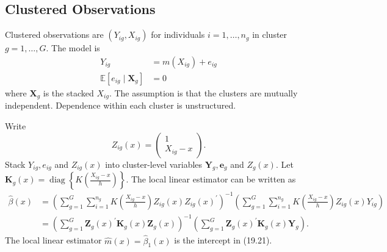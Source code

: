 \documentclass[10pt]{article}
\begin{document}
\subsection{Clustered Observations}
Clustered observations are $\left(Y_{i g}, X_{i g}\right)$ for individuals $i=1, \ldots, n_{g}$ in cluster $g=1, \ldots, G$. The model is
$$
\begin{aligned}
Y_{i g} &=m\left(X_{i g}\right)+e_{i g} \\
\mathbb{E}\left[e_{i g} \mid \boldsymbol{X}_{g}\right] &=0
\end{aligned}
$$
where $\boldsymbol{X}_{g}$ is the stacked $X_{i g}$. The assumption is that the clusters are mutually independent. Dependence within each cluster is unstructured.

Write
$$
Z_{i g}(x)=\left(\begin{array}{c}
1 \\
X_{i g}-x
\end{array}\right) .
$$
Stack $Y_{i g}, e_{i g}$ and $Z_{i g}(x)$ into cluster-level variables $\boldsymbol{Y}_{g}, \boldsymbol{e}_{g}$ and $Z_{g}(x)$. Let $\boldsymbol{K}_{g}(x)=\operatorname{diag}\left\{K\left(\frac{X_{i g}-x}{h}\right)\right\}$. The local linear estimator can be written as
$$
\begin{aligned}
\widehat{\beta}(x) &=\left(\sum_{g=1}^{G} \sum_{i=1}^{n_{g}} K\left(\frac{X_{i g}-x}{h}\right) Z_{i g}(x) Z_{i g}(x)^{\prime}\right)^{-1}\left(\sum_{g=1}^{G} \sum_{i=1}^{n_{g}} K\left(\frac{X_{i g}-x}{h}\right) Z_{i g}(x) Y_{i g}\right) \\
&=\left(\sum_{g=1}^{G} \boldsymbol{Z}_{g}(x)^{\prime} \boldsymbol{K}_{g}(x) \boldsymbol{Z}_{g}(x)\right)^{-1}\left(\sum_{g=1}^{G} \boldsymbol{Z}_{g}(x)^{\prime} \boldsymbol{K}_{g}(x) \boldsymbol{Y}_{g}\right) .
\end{aligned}
$$
The local linear estimator $\widehat{m}(x)=\widehat{\beta}_{1}(x)$ is the intercept in (19.21).
\end{document}
